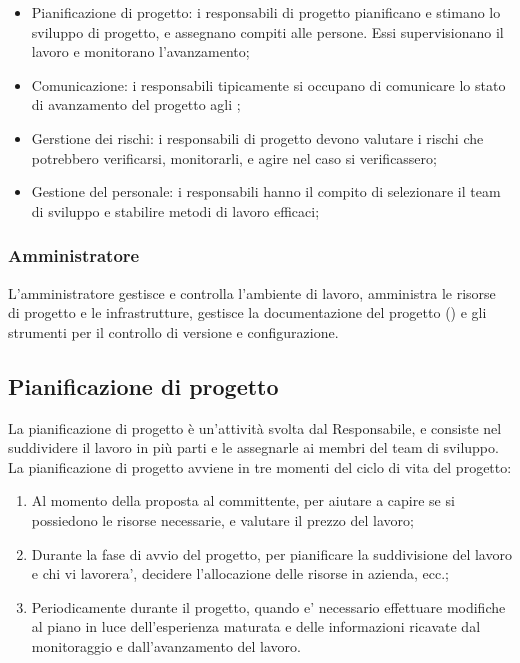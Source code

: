\begin{itemize}
  \item Pianificazione di progetto: i responsabili di progetto pianificano e
    stimano lo sviluppo di progetto, e assegnano compiti alle persone. Essi
    supervisionano il lavoro e monitorano l'avanzamento;
  \item Comunicazione: i responsabili tipicamente si occupano di comunicare lo
    stato di avanzamento del progetto agli ;
  \item Gerstione dei rischi: i responsabili di progetto devono valutare i
    rischi che potrebbero verificarsi, monitorarli, e agire nel caso si
    verificassero;
  \item Gestione del personale: i responsabili hanno il compito di selezionare
    il team di sviluppo e stabilire metodi di lavoro efficaci;
\end{itemize}

\subsubsection{Amministratore}

L'amministratore gestisce e controlla l'ambiente di lavoro, amministra le
risorse di progetto e le infrastrutture, gestisce la documentazione del progetto
() e gli strumenti per il controllo di versione e
configurazione.

\subsection{Pianificazione di progetto}

La pianificazione di progetto è un'attività svolta dal Responsabile, e consiste
nel suddividere il lavoro in più parti e le assegnarle ai membri del team di
sviluppo. La pianificazione di progetto avviene in tre momenti del ciclo di vita
del progetto:

\begin{enumerate}
  \item Al momento della proposta al committente, per aiutare a capire se si
    possiedono le risorse necessarie, e valutare il prezzo del lavoro;
  \item Durante la fase di avvio del progetto, per pianificare la suddivisione
    del lavoro e chi vi lavorera', decidere l'allocazione delle risorse in
    azienda, ecc.;
  \item Periodicamente durante il progetto, quando e' necessario effettuare
    modifiche al piano in luce dell'esperienza maturata e delle informazioni
    ricavate dal monitoraggio e dall'avanzamento del lavoro.
\end{enumerate}

